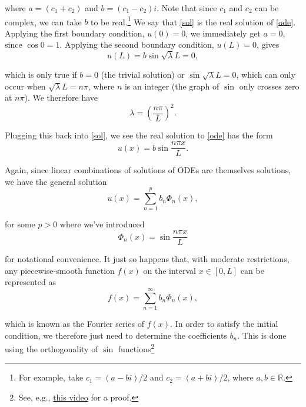 \documentclass[11pt]{article}
\numberwithin{equation}{section}
\begin{document}
where $a = (c_1 + c_2)$ and $b = (c_1 - c_2)i$. Note that since $c_1$ and $c_2$ can be complex, we can take $b$ to be real.\footnote{For example, take $c_1 = (a - bi)/2$ and $c_2 = (a + bi)/2$, where $a, b \in \mathbb{R}$.} We say that \eqref{sol} is the real solution of \eqref{ode}. Applying the first boundary condition, $u(0) = 0$, we immediately get $a = 0$, since $\cos 0 = 1$. Applying the second boundary condition, $u(L) = 0$, gives
\begin{equation*}
u(L) = b \sin \sqrt{\lambda} L = 0,
\end{equation*}

which is only true if $b = 0$ (the trivial solution) or $\sin \sqrt{\lambda} L = 0$, which can only occur when $\sqrt{\lambda} L = n \pi$, where $n$ is an integer (the graph of $\sin$ only crosses zero at $n \pi$). We therefore have 
\begin{equation*}
\lambda = \left( \frac{n \pi}{L} \right)^2.
\end{equation*}

Plugging this back into \eqref{sol}, we see the real solution to \eqref{ode} has the form 
\begin{equation*}
u(x) = b \sin \frac{n \pi x}{L}.
\end{equation*}

Again, since linear combinations of solutions of ODEs are themselves solutions, we have the general solution
\begin{equation}
u(x) = \sum_{n = 1}^p b_n \Phi_n(x),
\end{equation}

for some $p > 0$ where we've introduced
\begin{equation*}
\Phi_n(x) = \sin \frac{n \pi x}{L}
\end{equation*}

for notational convenience. It just so happens that, with moderate restrictions, any piecewise-smooth function $f(x)$ on the interval $x \in[0, L]$ can be represented as 
\begin{equation}
f(x) = \sum_{n = 1}^{\infty} b_n \Phi_n(x), \label{fourier}
\end{equation}

which is known as the Fourier series of $f(x)$. In order to satisfy the initial condition, we therefore just need to determine the coefficients $b_n$. This is done using the orthogonality of $\sin$ functions\footnote{See, e.g., \href{https://www.youtube.com/watch?v=87sM1B9rRjE}{this video} for a proof.}
\end{document}
